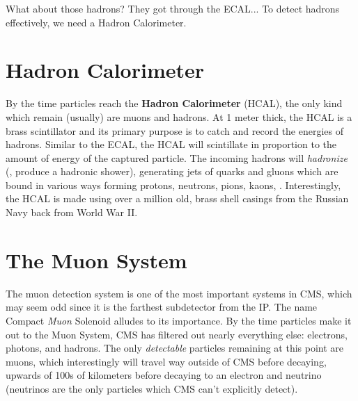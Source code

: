 What about those hadrons? They got through the ECAL... To detect hadrons effectively, we need a Hadron Calorimeter.

\section{Hadron Calorimeter}
By the time particles reach the {\bf Hadron Calorimeter} (HCAL), the only kind which remain (usually) are muons and hadrons.
At 1 meter thick, the HCAL is a brass scintillator and its primary purpose is to catch and record the energies of hadrons.
Similar to the ECAL, the HCAL will scintillate in proportion to the amount of energy of the captured particle. 
The incoming hadrons will \emph{hadronize} (\ie, produce a hadronic shower), generating jets of quarks and gluons which are bound in various ways forming protons, neutrons, pions, kaons, \etc.
Interestingly, the HCAL is made using over a million old, brass shell casings from the Russian Navy back from World War II.







\section{The Muon System}

The muon detection system is one of the most important systems in CMS, which may seem odd since it is the farthest subdetector from the IP.
The name Compact {\it Muon} Solenoid alludes to its importance.
By the time particles make it out to the Muon System, CMS has filtered out nearly everything else: electrons, photons, and hadrons.
The only \emph{detectable} particles remaining at this point are muons, which interestingly will travel way outside of CMS before decaying, upwards of 100s of kilometers before decaying to an electron and neutrino (neutrinos are the only particles which CMS can't explicitly detect).

